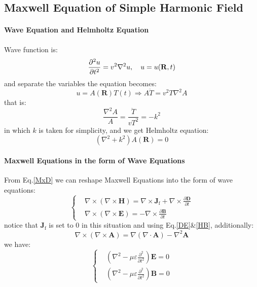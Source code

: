 \documentclass[11pt,a4paper,oneside]{book}
\begin{document}
\subsection{Maxwell Equation of Simple Harmonic Field}
\paragraph{Wave Equation and Helmholtz Equation} Wave function is:\begin{equation}
	{\displaystyle {\partial ^{2}u \over \partial t^{2}}=v^{2}\nabla ^{2}u},\quad u=u(\mathbf{R},t)
\end{equation}
and separate the variables the equation becomes:
\begin{equation}
	u=A(\mathbf{R})T(t)\Rightarrow A\ddot T=v^2T\nabla^2A
\end{equation}
that is:\begin{equation}
	\frac{\nabla^2 A}{A}=\frac{\ddot T}{vT^2}=-k^2
\end{equation}
in which $k$ is taken for simplicity, and we get Helmholtz equation:
\begin{equation}
	\left(\nabla^2 +k^2 \right)A(\mathbf{R})=0
\end{equation}
\paragraph{Maxwell Equations in the form of Wave Equations} From Eq.\ref{MxD} we can reshape Maxwell Equations into the form of wave equations:
\begin{equation}
	\left\{
	\begin{aligned}
		&\nabla\times\left(\nabla\times\mathbf{H}\right)=\nabla\times \mathbf{J}_\text{f}+\nabla\times\frac{\partial \mathbf{D}}{\partial t}\\
		&\nabla\times\left(\nabla\times\mathbf{E}\right)=-\nabla\times\frac{\partial \mathbf{B}}{\partial t}
	\end{aligned}
	\right.
\end{equation}
notice that $\mathbf{J}_\text{f}$ is set to 0 in this situation and using Eq.\ref{DE}\&\ref{HB}, additionally:\begin{equation}
	\nabla\times\left(\nabla\times\mathbf{A}\right)=\nabla\left(\nabla\cdot\mathbf{A}\right)-\nabla^2\mathbf{A}
\end{equation}
we have:\begin{equation}\label{WM}
	\left\{
	\begin{aligned}
		&\left(\nabla^2-\mu\varepsilon\frac{\partial^2}{\partial t^2} \right)\mathbf{E}=0\\
		&\left(\nabla^2-\mu\varepsilon\frac{\partial^2}{\partial t^2} \right)\mathbf{B}=0
	\end{aligned}
	\right.
\end{equation}
\end{document}
